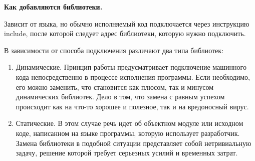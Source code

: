 \begin{center}{\bfseries Как добавляются библиотеки.}
\end{center}

Зависит от языка, но обычно исполняемый код подключается через инструкцию include, после которой следует адрес библиотеки, которую нужно подключить. 

\begin{utv}
  В зависимости от способа подключения различают два типа библиотек:
  \begin{enumerate}
    \item Динамические. Принцип работы предусматривает подключение машинного кода непосредственно в процессе исполнения программы. Если необходимо, его можно заменить, что становится как плюсом, так и минусом динамических библиотек. Дело в том, что замена с равным успехом происходит как на что-то хорошее и полезное, так и на вредоносный вирус.
    \item Статические. В этом случае речь идет об объектном модуле или исходном коде, написанном на языке программы, которую использует разработчик. Замена библиотеки в подобной ситуации представляет собой нетривиальную задачу, решение которой требует серьезных усилий и временных затрат.
  \end{enumerate}
\end{utv}